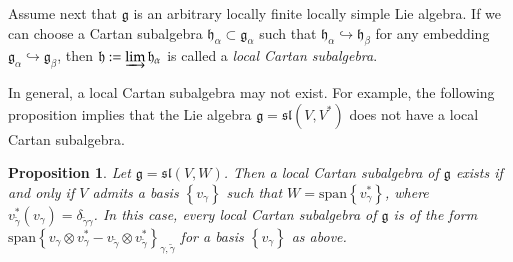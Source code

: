 \documentclass{svmult}
\newtheorem{prop}[theo]{Proposition}
\renewcommand{\sl}{\mathfrak{sl}}
\newcommand{\hh}{\mathfrak{h}}
\renewcommand{\gg}{\mathfrak{g}}
\renewcommand{\span}{\mathrm{span}}
\begin{document}
\vspace{0.33cm}

Assume next that $\gg$ is an arbitrary locally finite locally simple Lie algebra. If we can choose a Cartan subalgebra $\hh_\alpha\subset\gg_\alpha$ such that $\hh_\alpha\hookrightarrow\hh_\beta$ for 
any embedding $\gg_\alpha \hookrightarrow\gg_\beta$, then $\hh:=\varinjlim\hh_\alpha$ is called a {\it local Cartan subalgebra}.

In general, a local Cartan subalgebra may not exist. For example, the following proposition
implies that the Lie algebra $\gg=\sl(V,V^*)$  does not have a local Cartan subalgebra. 

\begin{prop}\label{prop:1.4.10}
 Let $\gg = \sl(V,W)$. Then a local Cartan subalgebra of $\gg$ exists if and only if 
$V$ admits a basis $\left\lbrace v_\gamma \right\rbrace$ such that $W= \span\left\lbrace v_{\gamma}^* \right\rbrace$, 
where $v_{\tilde\gamma}^*(v_\gamma) = \delta_{{\tilde{\gamma}}\gamma}$. In this case, every local Cartan subalgebra of 
$\gg$ is of the form $\span\left\lbrace v_\gamma \otimes v_\gamma^* - v_{\tilde\gamma} \otimes v_{\tilde\gamma}^*\right\rbrace_{\gamma,\tilde\gamma}$ 
for a basis $\left\lbrace v_\gamma \right\rbrace$ as above.
\end{prop}
\end{document}
